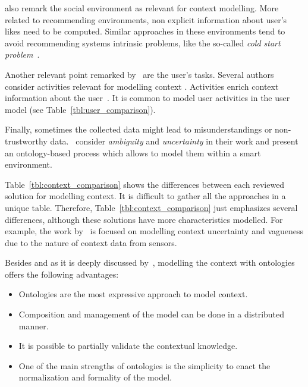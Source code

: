 \citet{schmidt_there_1999} also remark the social environment as relevant for 
context modelling. More related to recommending environments, non explicit 
information about user's likes need to be computed. Similar approaches in these 
environments tend to avoid recommending systems intrinsic problems, like the 
so-called \textit{cold start problem}~\citep{castillejo_alleviating_2012}\citep{castillejo_social_2012}.

Another relevant point remarked by~\citet{schmidt_there_1999} are the user's tasks.
Several authors consider activities relevant for modelling context 
\citep{henricksen_modeling_2002}\citep{gu_toward_2004}\citep{abowd_towards_1999}.
Activities enrich context information about the user~\citep{razmerita_ontology_based_2003}.
It is common to model user activities in the user model (see Table~\ref{tbl:user_comparison}). 

Finally, sometimes the collected data might lead to misunderstandings or 
non-trustworthy data.~\citet{almeida_assessing_2012} consider \textit{ambiguity}
and \textit{uncertainty} in their work and present an ontology-based process 
which allows to model them within a smart environment.

\bigskip

Table~\ref{tbl:context_comparison} shows the differences between each reviewed
solution for modelling context. It is difficult to gather all the approaches in a
unique table. Therefore, Table~\ref{tbl:context_comparison} just emphasizes several
differences, although these solutions have more characteristics modelled. For example,
the work by~\citet{almeida_assessing_2012} is focused on modelling context uncertainty
and vagueness due to the nature of context data from sensors.

Besides and as it is deeply discussed by~\citet{strang_context_2004}, modelling 
the context with ontologies offers the following advantages:
\begin{itemize}
  \item Ontologies are the most expressive approach to model context.
  \item Composition and management of the model can be done in a distributed
  manner.
  \item It is possible to partially validate the contextual knowledge.
  \item One of the main strengths of ontologies is the simplicity to enact the
  normalization and formality of the model.
\end{itemize}

